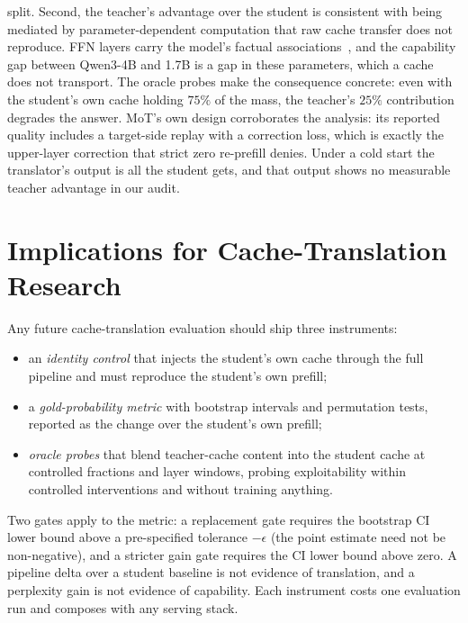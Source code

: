 \documentclass{article} %
\begin{document}
split. Second, the teacher's advantage over the student is consistent with
being mediated by parameter-dependent computation that raw cache transfer does
not reproduce. FFN layers carry the model's factual
associations~\citep{ffnmemory2021}, and the capability gap between Qwen3-4B
and 1.7B is a gap in these parameters, which a cache does not transport. The
oracle probes make the consequence concrete: even with the student's own
cache holding $75\%$ of the mass, the teacher's $25\%$ contribution degrades
the answer. MoT's own design corroborates the analysis: its reported quality
includes a target-side replay with a correction loss, which is exactly the
upper-layer correction that strict zero re-prefill denies. Under a cold
start the translator's output is all the student gets, and that output shows
no measurable teacher advantage in our audit.

\section{Implications for Cache-Translation Research}
\label{sec:implications}

Any future cache-translation evaluation should ship three instruments:
\begin{itemize}
\item an \emph{identity control} that injects the student's own cache through
the full pipeline and must reproduce the student's own prefill;
\item a \emph{gold-probability metric} with bootstrap intervals and
permutation tests, reported as the change over the student's own prefill;
\item \emph{oracle probes} that blend teacher-cache content into the student
cache at controlled fractions and layer windows, probing exploitability within
controlled interventions and without training anything.
\end{itemize}
Two gates apply to the metric: a replacement gate requires the bootstrap CI
lower bound above a pre-specified tolerance $-\epsilon$ (the point estimate
need not be non-negative), and a stricter
gain gate requires the CI lower bound above zero. A pipeline delta over a
student baseline is not evidence of translation, and a perplexity gain is not
evidence of capability. Each instrument costs one evaluation run and composes
with any serving stack.
\end{document}
